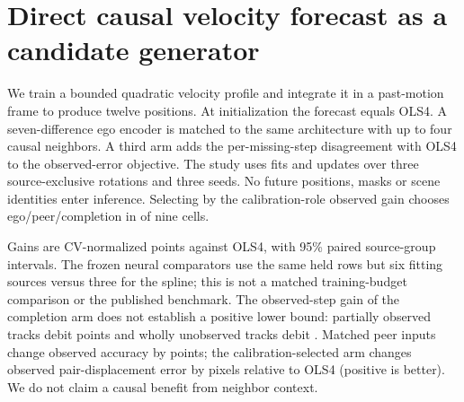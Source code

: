 \section{Direct causal velocity forecast as a candidate generator}
We train a bounded quadratic velocity profile and integrate it in a
past-motion frame to produce twelve positions. At initialization the
forecast equals OLS4. A seven-difference ego encoder is matched to the
same architecture with up to four causal neighbors. A third arm adds
the per-missing-step disagreement with OLS4 to the observed-error
objective. The study uses \VelSplineFitCount{} fits and
\VelSplineUpdates{} updates over three source-exclusive rotations
and three seeds. No future positions, masks or scene identities enter
inference. Selecting by the calibration-role observed gain chooses
ego/peer/completion in \VelSplineSelectedChoices{} of nine cells.

\begin{center}
\small
{}
\end{center}

Gains are CV-normalized points against OLS4, with 95\% paired
source-group intervals. The frozen neural comparators use the same
held rows but six fitting sources versus three for the spline; this
is not a matched training-budget comparison or the published benchmark.
The observed-step
gain of the completion arm does not establish a positive lower bound:
partially observed tracks debit \VelSplinePartialDebit{} points
and wholly unobserved tracks debit \VelSplineMissingDebit{}.
Matched peer inputs change observed accuracy by \VelSplinePeerAblation{}
points; the calibration-selected arm changes observed pair-displacement
error by \VelSplinePairSelected{} pixels relative to OLS4 (positive
is better). We do not claim a causal benefit from neighbor context.

